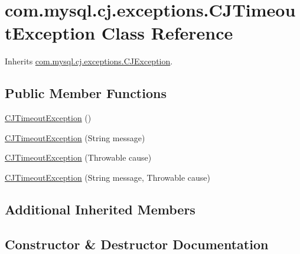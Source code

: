 \hypertarget{classcom_1_1mysql_1_1cj_1_1exceptions_1_1_c_j_timeout_exception}{}\section{com.\+mysql.\+cj.\+exceptions.\+C\+J\+Timeout\+Exception Class Reference}
\label{classcom_1_1mysql_1_1cj_1_1exceptions_1_1_c_j_timeout_exception}


Inherits \mbox{\hyperlink{classcom_1_1mysql_1_1cj_1_1exceptions_1_1_c_j_exception}{com.\+mysql.\+cj.\+exceptions.\+C\+J\+Exception}}.

\subsection*{Public Member Functions}
\begin{DoxyCompactItemize}
\item 
\mbox{\hyperlink{classcom_1_1mysql_1_1cj_1_1exceptions_1_1_c_j_timeout_exception_ad92cdcbed4f66a96832fb42934a9c83f}{C\+J\+Timeout\+Exception}} ()
\item 
\mbox{\hyperlink{classcom_1_1mysql_1_1cj_1_1exceptions_1_1_c_j_timeout_exception_a77c2e9166956b995c10f7836646be19e}{C\+J\+Timeout\+Exception}} (String message)
\item 
\mbox{\hyperlink{classcom_1_1mysql_1_1cj_1_1exceptions_1_1_c_j_timeout_exception_a60271a4df1efbfe6c01767e0652f6997}{C\+J\+Timeout\+Exception}} (Throwable cause)
\item 
\mbox{\hyperlink{classcom_1_1mysql_1_1cj_1_1exceptions_1_1_c_j_timeout_exception_a5b3db9824c2b446e1fad355a41d11793}{C\+J\+Timeout\+Exception}} (String message, Throwable cause)
\end{DoxyCompactItemize}
\subsection*{Additional Inherited Members}


\subsection{Constructor \& Destructor Documentation}
\mbox{\label{classcom_1_1mysql_1_1cj_1_1exceptions_1_1_c_j_timeout_exception_ad92cdcbed4f66a96832fb42934a9c83f}} 
